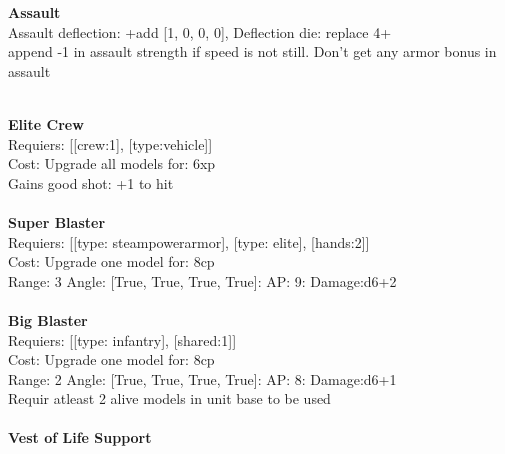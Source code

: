 {\bf Assault} \ \\
Assault deflection: +add [1, 0, 0, 0], Deflection die: replace 4+
\\ 

append -1 in assault strength if speed is not still. Don't get any armor bonus in assault


\ \\
{\bf Elite Crew } \\

Requiers: [[crew:1], [type:vehicle]] \\
Cost: Upgrade all models for: 6xp \\
Gains good shot: +1 to hit\\ 









\ \\
{\bf Super Blaster } \\

Requiers: [[type: steampowerarmor], [type: elite], [hands:2]] \\
Cost: Upgrade one model for: 8cp \\


Range: 3  Angle: [True, True, True, True]: AP: 9: Damage:d6+2 \\








\ \\
{\bf Big Blaster } \\

Requiers: [[type: infantry], [shared:1]] \\
Cost: Upgrade one model for: 8cp \\


Range: 2  Angle: [True, True, True, True]: AP: 8: Damage:d6+1 \\
Requir atleast 2 alive models in unit base to be used\\ 








\ \\
{\bf Vest of Life Support } \\

